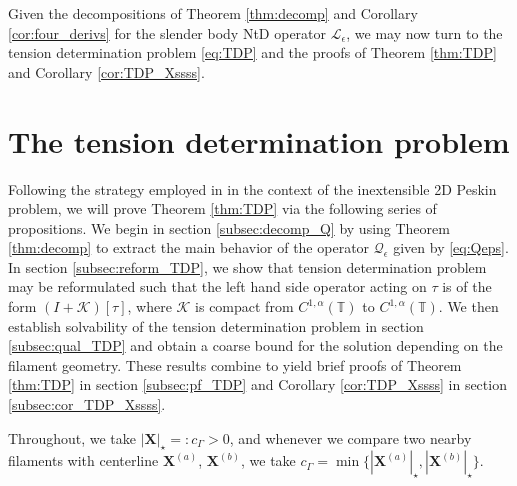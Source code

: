 \documentclass[11pt,reqno]{amsart}
\newcommand{\T}{\mathbb{T}}
\newcommand{\X}{\bm{X}}
\newcommand{\abs}[1]{\left\lvert #1 \right\rvert}
\newcommand{\mc}[1]{\mathcal{#1}}
\theoremstyle{definition}
\begin{document}
Given the decompositions of Theorem \ref{thm:decomp} and Corollary \ref{cor:four_derivs} for the slender body NtD operator $\mc{L}_\epsilon$, we may now turn to the tension determination problem \eqref{eq:TDP} and the proofs of Theorem \ref{thm:TDP} and Corollary \ref{cor:TDP_Xssss}.



\section{The tension determination problem}\label{sec:TDP}

Following the strategy employed in \cite{garcia2025immersed} in the context of the inextensible 2D Peskin problem, we will prove Theorem \ref{thm:TDP} via the following series of propositions. We begin in section \ref{subsec:decomp_Q} by using Theorem \ref{thm:decomp} to extract the main behavior of the operator $\mc{Q}_\epsilon$ given by \eqref{eq:Qeps}. In section \ref{subsec:reform_TDP}, we show that tension determination problem may be reformulated such that the left hand side operator acting on $\tau$ is of the form $(I+\mc{K})[\tau]$, where $\mc{K}$ is compact from $C^{1,\alpha}(\T)$ to $C^{1,\alpha}(\T)$. We then establish solvability of the tension determination problem in section \ref{subsec:qual_TDP} and obtain a coarse bound for the solution depending on the filament geometry. These results combine to yield brief proofs of Theorem \ref{thm:TDP} in section \ref{subsec:pf_TDP} and Corollary \ref{cor:TDP_Xssss} in section \ref{subsec:cor_TDP_Xssss}.

Throughout, we take $\abs{\X}_\star=:c_\Gamma>0$, and whenever we compare two nearby filaments with centerline $\X^{(a)}$, $\X^{(b)}$, we take $c_\Gamma=\min\{|\X^{(a)}|_\star,|\X^{(b)}|_\star\}$. 

\end{document}
